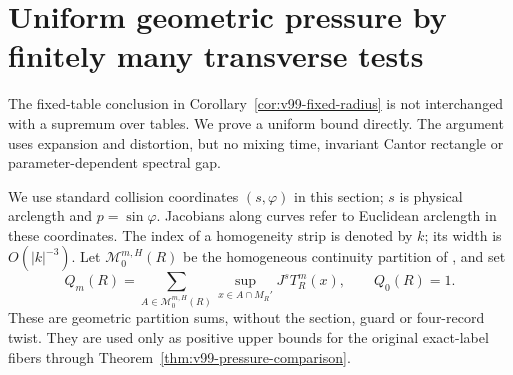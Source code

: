 \section{Uniform geometric pressure by finitely many transverse tests}
\label{sec:v100-pressure}
The fixed-table conclusion in Corollary~\ref{cor:v99-fixed-radius}
is not interchanged with a supremum over tables. We prove a uniform
bound directly. The argument uses expansion and distortion, but no
mixing time, invariant Cantor rectangle or parameter-dependent
spectral gap.

We use standard collision coordinates $(s,\varphi)$ in this section;
$s$ is physical arclength and $p=\sin\varphi$. Jacobians along curves
refer to Euclidean arclength in these coordinates. The index of a
homogeneity strip is denoted by $k$; its width is $O(|k|^{-3})$.
Let $\mathcal M_0^{m,H}(R)$ be the homogeneous continuity partition
of \cite[(2.4)]{BDPressure}, and set
\begin{equation}\label{eq:v100-Q}
 Q_m(R)=\sum_{A\in\mathcal M_0^{m,H}(R)}
               \sup_{x\in A\cap M_R'}J^sT_R^m(x),\qquad Q_0(R)=1.
\end{equation}
These are geometric partition sums, without the section, guard or
four-record twist. They are used only as positive upper bounds for
the original exact-label fibers through Theorem~\ref{thm:v99-pressure-comparison}.

